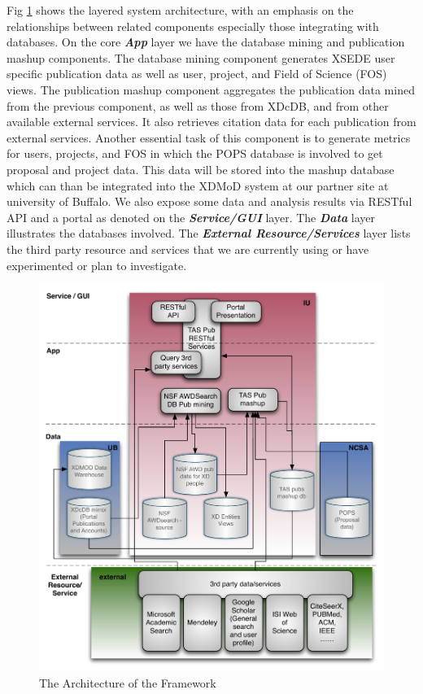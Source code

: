 \documentclass{sig-alternate}
\begin{document}
Fig \ref{F:tas-arch} shows the layered system architecture, with an emphasis on the relationships between related components especially those integrating with databases. On the core \emph{\textbf{App}} layer we have the database mining and publication mashup components. The database mining component generates XSEDE user specific publication data as well as user, project, and Field of Science (FOS) views. The publication mashup component aggregates the publication data mined from the previous component, as well as those from XDcDB, and from other available external services. It also retrieves citation data for each publication from external services. Another essential task of this component is to generate metrics for users, projects, and FOS in which the POPS database is involved to get proposal and project data. This data will be stored into the mashup database which can than be integrated into the XDMoD \cite{Furlani:2013:UXF:2484762.2484763} system at our partner site at university of Buffalo. We also expose some data and analysis results via RESTful API and a portal as denoted on the \emph{\textbf{Service/GUI}} layer. The \emph{\textbf{Data}} layer illustrates the databases involved. The \emph{\textbf{External Resource/Services}} layer lists the third party resource and services that we are currently using or have experimented or plan to investigate.

\begin{figure}[htb] 
  \centering 
    \includegraphics[width=1.0\columnwidth]{images/tas-arch.pdf} 
  \caption{The Architecture of the Framework}\label{F:tas-arch} 
\end{figure} 
\end{document}

